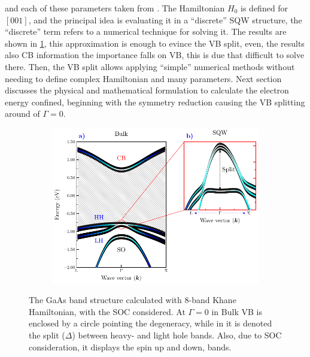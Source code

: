 and each of these parameters taken from \cite{vurgaftman2020bands}. The Hamiltonian $H_{0}$ is defined for $\left[001\right]$, and the principal idea is evaluating it in a ``discrete'' SQW structure, the ``discrete'' term refers to a numerical technique for solving it. The results are shown in \cref{subfig:chapter-2-sec-numerical-calculations-kp-bands-sqw-b}, this approximation is enough to evince the \gls{VB} split, even, the results also \gls{CB} information the importance falls on  \gls{VB}, this is due that difficult to solve there.  Then, the VB split allows applying ``simple'' numerical methods without needing to define complex Hamiltonian and many parameters. Next section discusses the physical and mathematical formulation to calculate the electron energy confined, beginning with the symmetry reduction  causing the \gls{VB} splitting around of $\Gamma = 0$. 
\begin{figure}[H]
	\centering
	\begin{subfigure}{\textwidth}
		\includegraphics[width=\textwidth]{../figures/chapter-2/numerical-calculations/out/kp-bands}
		\label{subfig:chapter-2-sec-numerical-calculations-kp-bands-bulk-a}
		\label{subfig:chapter-2-sec-numerical-calculations-kp-bands-sqw-b}
	\end{subfigure}
	\caption[ The GaAs band structure calculated with 8-band Khane Hamiltonian\cite{kane1957bandstructure,novik2005bandstructure}]
	{
	 The GaAs band structure calculated with 8-band Khane Hamiltonian\cite{kane1957bandstructure,novik2005bandstructure}, with the SOC considered. At $\Gamma = 0$ in Bulk VB is enclosed by a circle pointing the degeneracy, while in  it is denoted the split ($\Delta$) between heavy- and light hole bands. Also, due to SOC consideration, it displays the spin up and down, bands. 
	}\label{fig:chapter-2-sec-numerical-calculations-kp-bands}
\end{figure}


